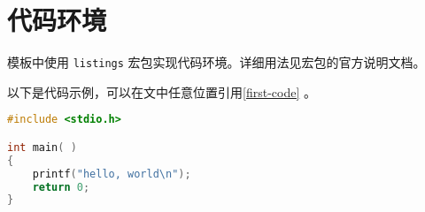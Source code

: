 \chapter{代码环境}
模板中使用 \texttt{listings} 宏包实现代码环境。详细用法见宏包的官方说明文档。

以下是代码示例，可以在文中任意位置引用\autoref{first-code} 。
\begin{lstlisting}[language=C, caption=示例代码, label={code:first-code}]
#include <stdio.h>

int main( )
{
    printf("hello, world\n");
    return 0;
}
\end{lstlisting}

